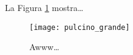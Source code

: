 \documentclass{article}
\begin{document}
La Figura \ref{fig:pulc} mostra\ldots

\begin{figure}
\centering
\texttt{[image: pulcino\_grande]}
\caption{\label{fig:pulc}Awww\ldots}
\end{figure}
\end{document}
